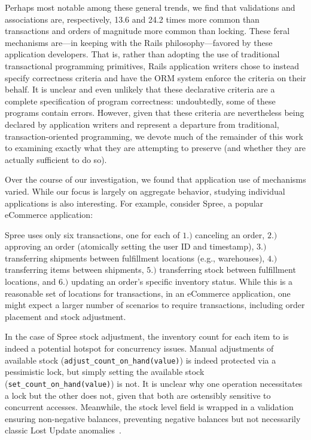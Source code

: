Perhaps most notable among these general trends, we find that
validations and associations are, respectively, 13.6 and 24.2 times
more common than transactions and orders of magnitude more common than
locking. These feral mechanisms are---in keeping with the Rails
philosophy---favored by these application developers. That is, rather
than adopting the use of traditional transactional programming
primitives, Rails application writers chose to instead specify
correctness criteria and have the ORM system enforce the criteria on
their behalf. It is unclear and even unlikely that these declarative
criteria are a complete specification of program correctness:
undoubtedly, some of these programs contain errors. However, given
that these criteria are nevertheless being declared by application
writers and represent a departure from traditional,
transaction-oriented programming, we devote much of the remainder of
this work to examining exactly what they are attempting to preserve
(and whether they are actually sufficient to do so).

 Over the course of our
investigation, we found that application use of mechanisms
varied. While our focus is largely on aggregate behavior, studying
individual applications is also interesting. For example, consider
Spree, a popular eCommerce application:

Spree uses only six transactions, one for each of $1.)$ canceling an
order, $2.)$ approving an order (atomically setting the user ID and
timestamp), $3.)$ transferring shipments between fulfillment locations
(e.g., warehouses), $4.)$ transferring items between shipments, $5.)$
transferring stock between fulfillment locations, and $6.)$ updating an
order's specific inventory status. While this is a reasonable set of
locations for transactions, in an eCommerce application, one might
expect a larger number of scenarios to require transactions, including
order placement and stock adjustment.

In the case of Spree stock adjustment, the inventory count for each
item to is indeed a potential hotspot for concurrency issues. Manual
adjustments of available stock
(\texttt{adjust\_count\_on\_hand(value)}) is indeed protected via a
pessimistic lock, but simply setting the available stock
(\texttt{set\_count\_on\_hand(value)}) is not. It is unclear why one
operation necessitates a lock but the other does not, given that both
are ostensibly sensitive to concurrent accesses. Meanwhile, the stock
level field is wrapped in a validation ensuring non-negative balances,
preventing negative balances but not necessarily classic Lost Update
anomalies~\cite{adya-isolation}.

